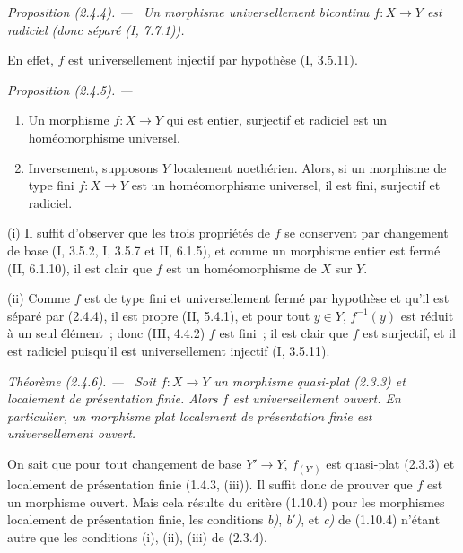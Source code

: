 \documentclass[10pt,oneside]{book}
\makeatletter
\newcommand{\oldpage}[2][]{%
  \setcounter{footnote}{0}%
  \marginpar{\scriptsize\textbf{#1}~|~#2}\ignorespaces}
\newenvironment{proposition}[1][]{%
  \par\medskip\noindent\itshape Proposition (#1). ---\ }{\par}
\newenvironment{theorem}[1][]{%
  \par\medskip\noindent\itshape Théorème (#1). ---\ }{\par}
\newcommand{\EGAReaderTarget}[2]{\hypertarget{#1}{}\@bsphack\begingroup\def\@currentHref{#1}\label{#2}\endgroup\@esphack}
\makeatother
\begin{document}
\begin{proposition}[2.4.4]
\label{IV.2.4.4-fr}
Un morphisme universellement bicontinu $f:X\to Y$ est radiciel (donc séparé
(I, 7.7.1)).
\end{proposition}

En effet, $f$ est universellement injectif par hypothèse (I, 3.5.11).

\begin{proposition}[2.4.5]
\EGAReaderTarget{ega4.c04.prop.2-4-5}{IV.2.4.5-fr}
\begin{enumerate}
\item[(i)] Un morphisme $f:X\to Y$ qui est entier, surjectif et radiciel est
un homéomorphisme universel.
\item[(ii)] Inversement, supposons $Y$ localement noethérien. Alors, si un
morphisme de type fini $f:X\to Y$ est un homéomorphisme universel, il est
fini, surjectif et radiciel.
\end{enumerate}
\end{proposition}

(i) Il suffit d'observer que les trois propriétés de $f$ se conservent par
changement de base (I, 3.5.2, I, 3.5.7 et II, 6.1.5), et comme un morphisme
entier est fermé (II, 6.1.10), il est clair que $f$ est un homéomorphisme de
$X$ sur $Y$.

(ii) Comme $f$ est de type fini et universellement fermé par hypothèse et
qu'il est séparé par (2.4.4), il est propre (II, 5.4.1), et pour tout
$y\in Y$, $f^{-1}(y)$ est réduit à un seul élément~; donc (III, 4.4.2) $f$
est fini~; il est clair que $f$ est surjectif, et il est radiciel puisqu'il
est universellement injectif (I, 3.5.11).

\begin{theorem}[2.4.6]
\label{IV.2.4.6-fr}
Soit $f:X\to Y$ un morphisme quasi-plat (2.3.3) et localement de présentation
finie. Alors $f$ est universellement ouvert. En particulier, un morphisme plat
localement de présentation finie est universellement ouvert.
\end{theorem}

On sait que pour tout changement de base $Y'\to Y$, $f_{(Y')}$ est
quasi-plat (2.3.3) et localement de présentation finie (1.4.3, (iii)). Il
suffit donc de prouver que $f$ est un
\oldpage[IV-2]{21}
morphisme ouvert. Mais cela résulte du critère (1.10.4) pour les morphismes
localement de présentation finie, les conditions \emph{b)}, \emph{b$'$)}, et
\emph{c)} de (1.10.4) n'étant autre que les conditions (i), (ii), (iii) de
(2.3.4).
\end{document}
